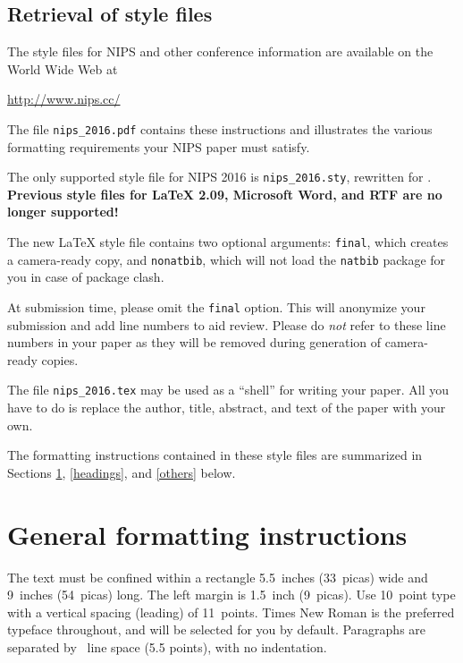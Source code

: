 \documentclass{article}
\begin{document}
  \subsection{Retrieval of style files}
  
  The style files for NIPS and other conference information are
  available on the World Wide Web at
  \begin{center}
    \url{http://www.nips.cc/}
  \end{center}
  The file \verb+nips_2016.pdf+ contains these instructions and
  illustrates the various formatting requirements your NIPS paper must
  satisfy.
  
  The only supported style file for NIPS 2016 is \verb+nips_2016.sty+,
  rewritten for \LaTeXe{}.  \textbf{Previous style files for \LaTeX{}
    2.09, Microsoft Word, and RTF are no longer supported!}
  
  The new \LaTeX{} style file contains two optional arguments:
  \verb+final+, which creates a camera-ready copy, and \verb+nonatbib+,
  which will not load the \verb+natbib+ package for you in case of
  package clash.
  
  At submission time, please omit the \verb+final+ option. This will
  anonymize your submission and add line numbers to aid review.  Please
  do \emph{not} refer to these line numbers in your paper as they will
  be removed during generation of camera-ready copies.
  
  The file \verb+nips_2016.tex+ may be used as a ``shell'' for writing
  your paper. All you have to do is replace the author, title, abstract,
  and text of the paper with your own.
  
  The formatting instructions contained in these style files are
  summarized in Sections \ref{gen_inst}, \ref{headings}, and
  \ref{others} below.
  
  \section{General formatting instructions}
  \label{gen_inst}
  
  The text must be confined within a rectangle 5.5~inches (33~picas)
  wide and 9~inches (54~picas) long. The left margin is 1.5~inch
  (9~picas).  Use 10~point type with a vertical spacing (leading) of
  11~points.  Times New Roman is the preferred typeface throughout, and
  will be selected for you by default.  Paragraphs are separated by
  ~line space (5.5 points), with no indentation.
  
\end{document}
